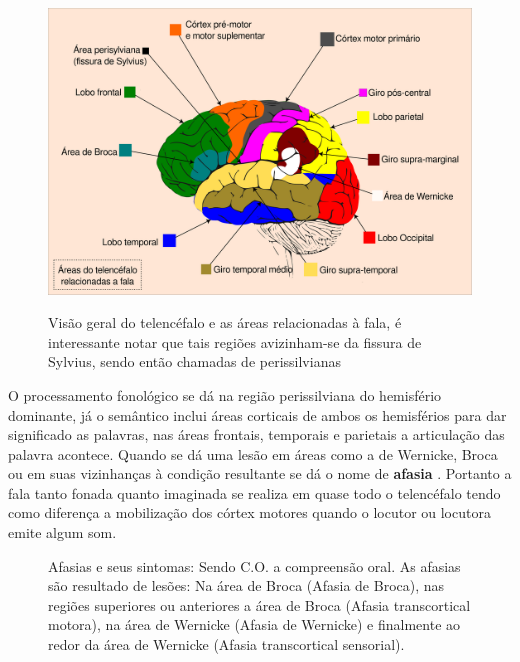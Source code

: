 			\begin{figure}[p]
				\centering
				\caption[Visão geral do telencéfalo]{Visão geral do telencéfalo e as áreas relacionadas à fala, é interessante notar que tais regiões avizinham-se da fissura de Sylvius, sendo então chamadas de perissilvianas \cite{pinto2012manual}}
				\includegraphics[angle=-90,width=.76\paperwidth,keepaspectratio]{images/teleencefaloTudo}
				\label{fig:teleencefalotudo}
			\end{figure}
			
			\par O processamento fonológico se dá na região perissilviana do hemisfério dominante, já o semântico inclui áreas corticais de ambos os hemisférios para dar significado as palavras, nas áreas frontais, temporais e parietais a articulação das palavra acontece. Quando se dá uma lesão em áreas como a de Wernicke, Broca ou em suas vizinhanças à condição resultante se dá o nome de \textbf{afasia} \cite{pinto2012manual}. Portanto  a fala tanto fonada quanto imaginada se realiza em quase todo o telencéfalo tendo como diferença a mobilização dos córtex motores quando o locutor ou locutora emite algum som.
			
			\begin{figure}[h]
				\centering
				\caption[Afasias e seus sintomas]{Afasias e seus sintomas: Sendo C.O. a compreensão oral. As afasias são resultado de lesões: Na área de Broca (Afasia de Broca), nas regiões superiores ou anteriores a área de Broca (Afasia transcortical motora), na área de Wernicke (Afasia de Wernicke) e finalmente ao redor da área de Wernicke (Afasia transcortical sensorial).}
				
			\end{figure}



